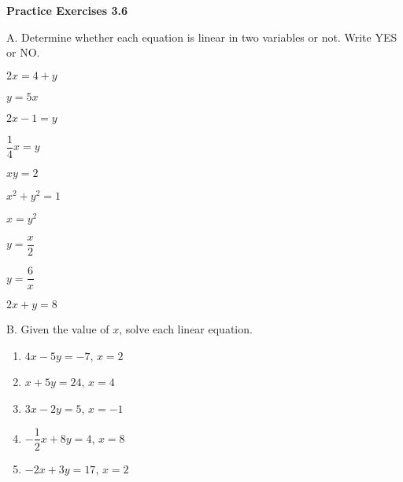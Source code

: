  \vspace{0.3ex}
\noindent\textbf{Practice Exercises 3.6}

\vspace{0.2ex}

A. Determine whether each equation is linear in two variables or not. Write YES or NO.
\begin{enumerate}[noitemsep, label = \color{blue}\arabic*. ]
\begin{multicols}{3}
    		\item $ 2x = 4 + y $
    		\item $ y = 5x $
    		\item $ 2x - 1 = y $
    		\item $ \dfrac{1}{4}x = y $
    		\item $ xy = 2 $
    		\item $ x^2 + y^2 = 1 $
    		\item $ x = y^2 $
    		\item $ y = \dfrac{x}{2} $
    		\item $ y = \dfrac{6}{x} $
    		\item $ 2x + y = 8 $
    	\end{multicols}
    	\end{enumerate}
    	
B. Given the value of $x$, solve each linear equation.\\
\vspace{-2ex}
\begin{multicols}{2}
\begin{enumerate}[noitemsep, label = \color{blue}\arabic*. ]
   \item $4x - 5y = -7$, $x= 2$
   \item $x + 5y = 24$, $x= 4$
   \item $3x - 2y = 5$, $x= -1 $
   \item $-\dfrac{1}{2}x + 8y = 4$, $x= 8$
   \item $-2x + 3y = 17$, $x= 2$
\end{enumerate}
\end{multicols}    	

